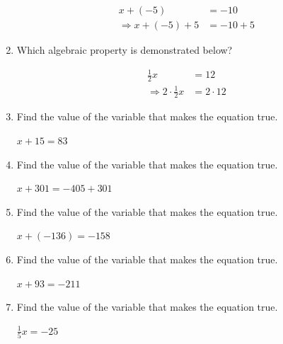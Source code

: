 \documentclass[18pt]{article}%
\begin{document}
\begin{multicols}{2}
\begin{enumerate}[label=\arabic*),start=1]
\begin{align*}x+(-5) &= -10 \\ \Rightarrow x+(-5)+5 &= -10+5\end{align*}%
\newline%
\newline%
%
\vspace{2cm}%
\item%
Which algebraic property is demonstrated below?

\begin{align*}\frac{1}{2}x &= 12 \\ \Rightarrow 2\cdot\frac{1}{2}x &= 2 \cdot 12\end{align*}%
\newline%
\newline%
%
\vspace{2cm}%
\item%
Find the value of the variable that makes the equation true.

$x+15=83$%
\newline%
\newline%
%
\vspace{5cm}%
\item%
Find the value of the variable that makes the equation true.

$x+301=-405+301$%
\newline%
\newline%
%
\vspace{5cm}%
\item%
Find the value of the variable that makes the equation true.

$x+(-136)=-158$%
\newline%
\newline%
%
\vspace{5cm}%
\item%
Find the value of the variable that makes the equation true.

$x+93=-211$%
\newline%
\newline%
%
\vspace{5cm}%
\item%
Find the value of the variable that makes the equation true.

$\frac{1}{5}x=-25$%
\newline%
\newline%
%
\vspace{5cm}%
\end{enumerate}

%
\end{multicols}%
\end{document}
